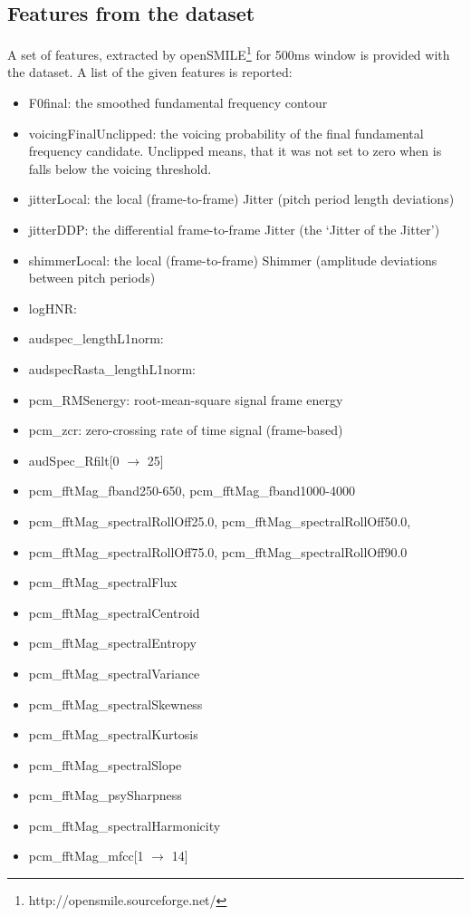 \subsection{Features from the dataset}

A set of features, extracted by openSMILE\footnote{http://opensmile.sourceforge.net/} for 500ms window is provided with the dataset. 
A list of the given features is reported:


\begin{itemize}
	\item F0final: the smoothed fundamental frequency contour
	\item voicingFinalUnclipped: the voicing probability of the final fundamental frequency candidate. Unclipped means, that it was not set to zero when is falls below the voicing threshold.

	\item jitterLocal: the local (frame-to-frame) Jitter (pitch period length deviations)

	\item jitterDDP: the differential frame-to-frame Jitter (the ‘Jitter of the Jitter’)

	\item shimmerLocal: the local (frame-to-frame) Shimmer (amplitude deviations between pitch periods)
	\item logHNR: 
	\item audspec\_lengthL1norm: 
	\item audspecRasta\_lengthL1norm: 
	\item pcm\_RMSenergy: root-mean-square signal frame energy

	\item pcm\_zcr: zero-crossing rate of time signal (frame-based)

	\item audSpec\_Rfilt[0 $\rightarrow$ 25]
	\item pcm\_fftMag\_fband250-650, pcm\_fftMag\_fband1000-4000
	\item pcm\_fftMag\_spectralRollOff25.0, pcm\_fftMag\_spectralRollOff50.0, 
	\item pcm\_fftMag\_spectralRollOff75.0, pcm\_fftMag\_spectralRollOff90.0
	\item pcm\_fftMag\_spectralFlux
	\item pcm\_fftMag\_spectralCentroid
	\item pcm\_fftMag\_spectralEntropy
	\item pcm\_fftMag\_spectralVariance
	\item pcm\_fftMag\_spectralSkewness
	\item pcm\_fftMag\_spectralKurtosis
	\item pcm\_fftMag\_spectralSlope
	\item pcm\_fftMag\_psySharpness
	\item pcm\_fftMag\_spectralHarmonicity
	\item pcm\_fftMag\_mfcc[1 $\rightarrow$ 14]
\end{itemize}


